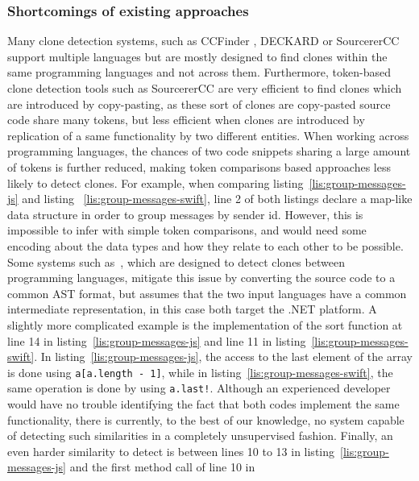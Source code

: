 \subsubsection{\label{sssec:shortcomings} Shortcomings of existing approaches}
Many clone detection systems, such as CCFinder
\cite{Kamiya:2002:CMT:636188.636191}, DECKARD
\cite{Jiang:2007:DSA:1248820.1248843} or SourcererCC
\cite{Sajnani:2016:SSC:2884781.2884877} support multiple languages but are
mostly designed to find clones within the same programming languages and not
across them. Furthermore, token-based clone detection tools
such as SourcererCC \cite{Sajnani:2016:SSC:2884781.2884877} are very efficient
to find clones which are introduced by copy-pasting, as these sort of clones
are copy-pasted source code share many tokens, but less efficient when clones
are introduced by replication of a same functionality by two different entities.
When working across programming languages, the chances of two code snippets
sharing a large amount of tokens is further reduced, making token comparisons
based approaches less likely to detect clones.
For example, when comparing listing~\ref{lis:group-messages-js} and listing
~\ref{lis:group-messages-swift}, line 2 of both listings declare a map-like
data structure in order to group messages by sender id. However, this is
impossible to infer with simple token comparisons, and would need some encoding
about the data types and how they relate to each other to be possible. Some
systems such as~\cite{kraft2008cross}, which are designed to detect clones
between programming languages, mitigate this issue by converting the
source code to a common AST format, but assumes that the two input languages
have a common intermediate representation, in this case both target the .NET
platform.
A slightly more complicated example is the implementation of the sort function
at line 14 in listing~\ref{lis:group-messages-js} and line 11 in
listing~\ref{lis:group-messages-swift}. In listing~\ref{lis:group-messages-js},
the access to the last element of the array is done using
\lstinline{a[a.length - 1]}, while in listing~\ref{lis:group-messages-swift},
the same operation is done by using \lstinline{a.last!}. Although an experienced
developer would have no trouble identifying the fact that both codes implement
the same functionality, there is currently, to the best of our knowledge, no
system capable of detecting such similarities in a completely unsupervised
fashion. Finally, an even harder similarity to detect is between lines 10 to 13
in listing~\ref{lis:group-messages-js} and the first method call of line 10 in
